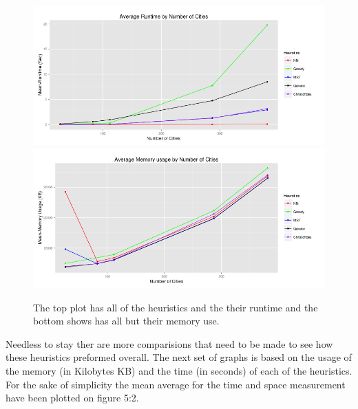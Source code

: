 \documentclass[midd]{thesis}
\newcommand{\tab}{\hspace*{2em}}
\begin{document}
\begin{figure}[t!]
	\begin{center}
	\caption{The top plot has all of the heuristics and the their runtime  and the bottom shows has all but their memory use.}
	\includegraphics[width=.95\textwidth]{time_numcities}
	\includegraphics[width=.95\textwidth]{mem_numcities}
	\end{center}
\end{figure}
\tab Needless to stay ther are more comparisions that need to be made to see how these heuristics preformed overall. The next set of graphs is based on the usage of the memory (in Kilobytes KB) and the time (in seconds) of each of the heuristics. For the sake of simplicity the mean average for the time and space measurement have been plotted on figure 5:2.\\
\end{document}
